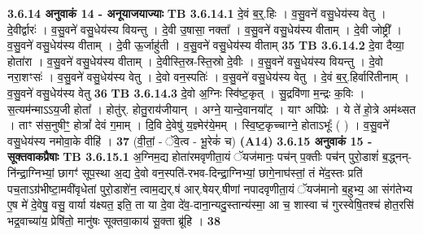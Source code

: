 \documentclass[17pt]{extarticle}
\begin{document}
{{{{{{{{{{{{{{{{{{{                \textbf{ 3.6.14    अनुवाकं   14 - अनूयाजयाज्याः} \newline
                                \textbf{ TB 3.6.14.1} \newline
                  दे॒वं ब॒र्॒.हिः । व॒सु॒वने॑ वसु॒धेय॑स्य वेतु । दे॒वीर्द्वारः॑ । व॒सु॒वने॑ वसु॒धेय॑स्य वियन्तु । दे॒वी उ॒षासा॒ नक्ता᳚ । व॒सु॒वने॑ वसु॒धेय॑स्य वीताम् । दे॒वी जोष्ट्री᳚ । व॒सु॒वने॑ वसु॒धेय॑स्य वीताम् । दे॒वी ऊ॒र्जाहु॑ती । व॒सु॒वने॑ वसु॒धेय॑स्य वीताम् \textbf{ 35} \newline
                  \newline
                                \textbf{ TB 3.6.14.2} \newline
                  दे॒वा दैव्या॒ होता॑रा । व॒सु॒वने॑ वसु॒धेय॑स्य वीताम् । दे॒वीस्ति॒स्र-स्ति॒स्रो दे॒वीः । व॒सु॒वने॑ वसु॒धेय॑स्य वियन्तु । दे॒वो नरा॒शꣳसः॑ । व॒सु॒वने॑ वसु॒धेय॑स्य वेतु । दे॒वो वन॒स्पतिः॑ । व॒सु॒वने॑ वसु॒धेय॑स्य वेतु । दे॒वं ब॒र्॒.हिर्वारि॑तीनाम् । व॒सु॒वने॑ वसु॒धेय॑स्य वेतु \textbf{ 36} \newline
                  \newline
                                \textbf{ TB 3.6.14.3} \newline
                  दे॒वो अ॒ग्निः स्वि॑ष्ट॒कृत् । सु॒द्रवि॑णा म॒न्द्रः क॒विः । स॒त्यम॑न्माऽऽय॒जी होता᳚ । होतु॑र्. होतु॒राय॑जीयान् । अग्ने॒ यान्दे॒वानया᳚ट् । याꣳ अपि॑प्रेः । ये ते॑ हो॒त्रे अम॑थ्सत । ताꣳ स॑स॒नुषीꣳ॒॒ होत्रां᳚ देवं ग॒माम् । दि॒वि दे॒वेषु॑ य॒ज्ञ्मेर॑ये॒मम् । स्वि॒ष्ट॒कृच्चाग्ने॒ होताऽभूः᳚ ( ) । व॒सु॒वने॑ वसु॒धेय॑स्य नमोवा॒के वीहि॑ । \textbf{ 37} \newline
                  \newline
                                    (वी॒तां॒ - ॅवे॒त्व - भू॒रेकं॑ च) \textbf{(A14)} \newline \newline
                \textbf{ 3.6.15    अनुवाकं   15 - सूक्तवाकप्रैषाः} \newline
                                \textbf{ TB 3.6.15.1} \newline
                  अ॒ग्निम॒द्य होता॑रमवृणीता॒यं ॅयज॑मानः॒ पच॑न् प॒क्तीः पच॑न् पुरो॒डाशं॑ ब॒द्ध्नन्-नि॑न्द्रा॒ग्निभ्यां॒ छागꣳ॑ सूप॒स्था अ॒द्य दे॒वो वन॒स्पति॑-रभव-दिन्द्रा॒ग्निभ्यां॒ छागे॒नाघ॑स्तां॒ तं मे॑द॒स्तः प्रति॑ पच॒ताऽग्र॑भीष्टा॒मवी॑वृधेतां पुरो॒डाशे॑न॒ त्वाम॒द्यर्.ष॑ आर्.षेयर्.षीणां नपादवृणीता॒यं ॅयज॑मानो ब॒हुभ्य॒ आ संग॑तेभ्य ए॒ष मे॑ दे॒वेषु॒ वसु॒ वार्या य॑क्ष्यत॒ इति॒ ता या दे॒वा दे॑व॒-दाना॒न्यदु॒स्तान्य॑स्मा॒ आ च॒ शास्वा च॑ गुरस्वेषि॒तश्च॑ होत॒रसि॑ भद्र॒वाच्या॑य॒ प्रेषि॑तो॒ मानु॑षः सूक्तवा॒काय॑ सू॒क्ता ब्रू॑हि । \textbf{ 38} \newline
}}}}}}}}}}}}}}}}}}}
\end{document}

